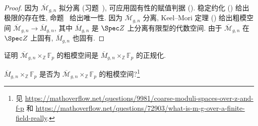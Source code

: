 \begin{proof}
因为 $\overline{\mathcal M}_{g,\allowbreak n}$ 拟分离 (习题~), 可应用固有性的赋值判据 (). 稳定约化 () 给出极限的存在性, 命题~ 给出唯一性. 因为 $\overline{\mathcal M}_{g,\allowbreak n}$ 分离, Keel--Mori 定理 () 给出粗模空间 $\overline{\mathcal M}_{g,\allowbreak n}\to\overline M_{g,\allowbreak n}$, 其中 $\overline M_{g,\allowbreak n}$ 是 $\Spec\mathbb Z$ 上分离有限型的代数空间. 由于 $\overline{\mathcal M}_{g,\allowbreak n}$ 在 $\Spec\mathbb Z$ 上固有, $\overline M_{g,\allowbreak n}$ 也固有.
\end{proof}
\begin{exercise}\label{src:6.5.24}
证明 $\overline{\mathcal M}_{g,\allowbreak n}\times_{\mathbb Z}\mathbb F_p$ 的粗模空间是 $\overline M_{g,\allowbreak n}\times_{\mathbb Z}\mathbb F_p$ 的正规化.
\end{exercise}
\newpage
\begin{question}[未解决]\label{src:6.5.25}
$\overline M_{g,\allowbreak n}\times_{\mathbb Z}\mathbb F_p$ 是否为 $\overline{\mathcal M}_{g,\allowbreak n}\times_{\mathbb Z}\mathbb F_p$ 的粗模空间?\footnote{见 \url{https://mathoverflow.net/questions/9981/coarse-moduli-spaces-over-z-and-f-p} 和 \url{https://mathoverflow.net/questions/72903/what-is-m-g-over-a-finite-field-really}.}
\end{question}
